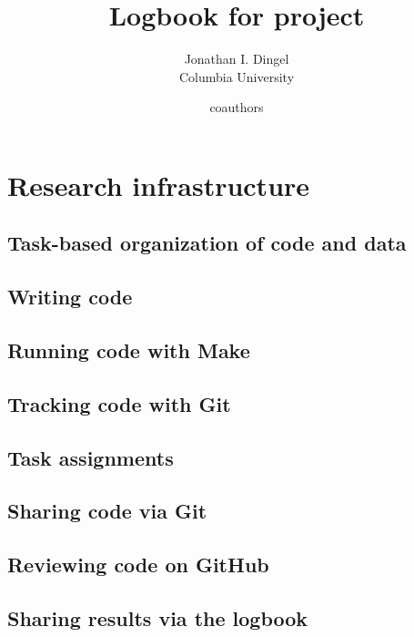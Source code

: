\documentclass{report}
\title{Logbook for project}
\author{
Jonathan I. Dingel \\ {Columbia University} \and
coauthors
}
\date{}
\numberwithin{equation}{section}
\numberwithin{figure}{section}
\numberwithin{table}{section}
\begin{document}
\maketitle

\renewcommand{\thechapter}{\Alph{chapter}}
\setcounter{tocdepth}{1}
\tableofcontents
\etocsettocstyle{}{} %

\chapter{Research infrastructure}


\section{Task-based organization of code and data} 
\section{Writing code} 
\section{Running code with Make} 
\section{Tracking code with Git} 

\section{Task assignments} 
\section{Sharing code via Git} 
\section{Reviewing code on GitHub} 
\section{Sharing results via the logbook} 
\end{document}

